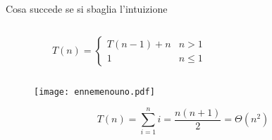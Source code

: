 
\begin{frame}{Cosa succede se si sbaglia l'intuizione}

\vspace{-6pt}
\begin{mybox}
\begin{columns}[c]
\begin{column}{0.46\textwidth}
\[
T(n) = \begin{cases}
      T( n-1 )  + n & n > 1 \\
     1 & n \leq 1
  \end{cases}
\]
\end{column}
\begin{column}{0.51\textwidth}
\end{column}
\end{columns}
\end{mybox}

\begin{overprint}
\begin{figure}
	\texttt{[image: ennemenouno.pdf]}
\end{figure}
\[
T(n) = \sum_{i=1}^n i = \frac{n (n+1)}{2} = \Theta(n^2)
\]
\end{overprint}

\end{frame}

